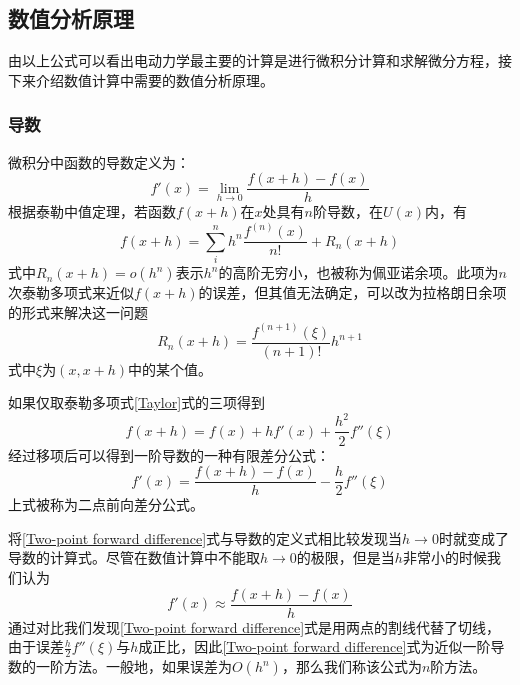 \documentclass[UTF8,a4paper,10pt]{ctexart}
\begin{document}
\begin{multicols}{2}
        \subsection{数值分析原理}
        由以上公式可以看出电动力学最主要的计算是进行微积分计算和求解微分方程，接下来介绍数值计算中需要的数值分析原理。
            \subsubsection{导数}
            微积分中函数的导数定义为：
            \begin{equation}
                f'(x) = \lim_{h\to 0}\frac{f(x+h)-f(x)}{h}
            \end{equation}
            根据泰勒中值定理，若函数$f(x+h)$在$x$处具有$n$阶导数，在$U(x)$内，有
            \begin{equation}\label{Taylor}
                f(x+h) = \sum_i^nh^n\frac{f^{(n)}(x)}{n!}+R_n(x+h)
            \end{equation}
            式中$R_n(x+h)=o(h^n)$表示$h^n$的高阶无穷小，也被称为佩亚诺余项。此项为$n$次泰勒多项式来近似$f(x+h)$的误差，但其值无法确定，可以改为拉格朗日余项的形式来解决这一问题
            \begin{equation*}
                R_n(x+h) = \frac{f^{(n+1)}(\xi)}{(n+1)!}h^{n+1}
            \end{equation*}
            式中$\xi$为$(x,x+h)$中的某个值。\par
            如果仅取泰勒多项式\eqref{Taylor}式的三项得到
            \begin{equation}
                f(x+h) = f(x) + hf'(x) + \frac{h^2}{2}f''(\xi)
            \end{equation}
            经过移项后可以得到一阶导数的一种有限差分公式：
            \begin{equation}\label{Two-point forward difference}
                f'(x) = \frac{f(x+h)-f(x)}{h} - \frac{h}{2}f''(\xi)
            \end{equation}
            上式被称为二点前向差分公式。\par
            将\eqref{Two-point forward difference}式与导数的定义式相比较发现当$h\to 0$时就变成了导数的计算式。尽管在数值计算中不能取$h\to 0$的极限，但是当$h$非常小的时候我们认为
            \begin{equation}
                f'(x) \approx \frac{f(x+h)-f(x)}{h}
            \end{equation}
            通过对比我们发现\eqref{Two-point forward difference}式是用两点的割线代替了切线，由于误差$\frac{h}{2}f''(\xi)$与$h$成正比，因此\eqref{Two-point forward difference}式为近似一阶导数的一阶方法。一般地，如果误差为$O(h^n)$，那么我们称该公式为$n$阶方法。\par

\end{multicols}
\end{document}
